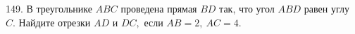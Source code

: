 149. В треугольнике $ABC$ проведена прямая $BD$ так, что угол $ABD$ равен углу $C.$ Найдите отрезки $AD$ и $DC,$ если $AB=2,\ AC=4.$\\
